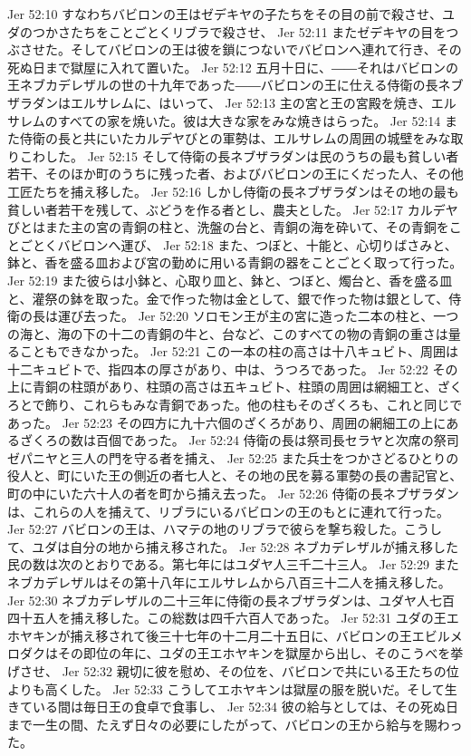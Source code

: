 Jer 52:10  すなわちバビロンの王はゼデキヤの子たちをその目の前で殺させ、ユダのつかさたちをことごとくリブラで殺させ、
Jer 52:11  またゼデキヤの目をつぶさせた。そしてバビロンの王は彼を鎖につないでバビロンへ連れて行き、その死ぬ日まで獄屋に入れて置いた。
Jer 52:12  五月十日に、――それはバビロンの王ネブカデレザルの世の十九年であった――バビロンの王に仕える侍衛の長ネブザラダンはエルサレムに、はいって、
Jer 52:13  主の宮と王の宮殿を焼き、エルサレムのすべての家を焼いた。彼は大きな家をみな焼きはらった。
Jer 52:14  また侍衛の長と共にいたカルデヤびとの軍勢は、エルサレムの周囲の城壁をみな取りこわした。
Jer 52:15  そして侍衛の長ネブザラダンは民のうちの最も貧しい者若干、そのほか町のうちに残った者、およびバビロンの王にくだった人、その他工匠たちを捕え移した。
Jer 52:16  しかし侍衛の長ネブザラダンはその地の最も貧しい者若干を残して、ぶどうを作る者とし、農夫とした。
Jer 52:17  カルデヤびとはまた主の宮の青銅の柱と、洗盤の台と、青銅の海を砕いて、その青銅をことごとくバビロンへ運び、
Jer 52:18  また、つぼと、十能と、心切りばさみと、鉢と、香を盛る皿および宮の勤めに用いる青銅の器をことごとく取って行った。
Jer 52:19  また彼らは小鉢と、心取り皿と、鉢と、つぼと、燭台と、香を盛る皿と、灌祭の鉢を取った。金で作った物は金として、銀で作った物は銀として、侍衛の長は運び去った。
Jer 52:20  ソロモン王が主の宮に造った二本の柱と、一つの海と、海の下の十二の青銅の牛と、台など、このすべての物の青銅の重さは量ることもできなかった。
Jer 52:21  この一本の柱の高さは十八キュビト、周囲は十二キュビトで、指四本の厚さがあり、中は、うつろであった。
Jer 52:22  その上に青銅の柱頭があり、柱頭の高さは五キュビト、柱頭の周囲は網細工と、ざくろとで飾り、これらもみな青銅であった。他の柱もそのざくろも、これと同じであった。
Jer 52:23  その四方に九十六個のざくろがあり、周囲の網細工の上にあるざくろの数は百個であった。
Jer 52:24  侍衛の長は祭司長セラヤと次席の祭司ゼパニヤと三人の門を守る者を捕え、
Jer 52:25  また兵士をつかさどるひとりの役人と、町にいた王の側近の者七人と、その地の民を募る軍勢の長の書記官と、町の中にいた六十人の者を町から捕え去った。
Jer 52:26  侍衛の長ネブザラダンは、これらの人を捕えて、リブラにいるバビロンの王のもとに連れて行った。
Jer 52:27  バビロンの王は、ハマテの地のリブラで彼らを撃ち殺した。こうして、ユダは自分の地から捕え移された。
Jer 52:28  ネブカデレザルが捕え移した民の数は次のとおりである。第七年にはユダヤ人三千二十三人。
Jer 52:29  またネブカデレザルはその第十八年にエルサレムから八百三十二人を捕え移した。
Jer 52:30  ネブカデレザルの二十三年に侍衛の長ネブザラダンは、ユダヤ人七百四十五人を捕え移した。この総数は四千六百人であった。
Jer 52:31  ユダの王エホヤキンが捕え移されて後三十七年の十二月二十五日に、バビロンの王エビルメロダクはその即位の年に、ユダの王エホヤキンを獄屋から出し、そのこうべを挙げさせ、
Jer 52:32  親切に彼を慰め、その位を、バビロンで共にいる王たちの位よりも高くした。
Jer 52:33  こうしてエホヤキンは獄屋の服を脱いだ。そして生きている間は毎日王の食卓で食事し、
Jer 52:34  彼の給与としては、その死ぬ日まで一生の間、たえず日々の必要にしたがって、バビロンの王から給与を賜わった。


